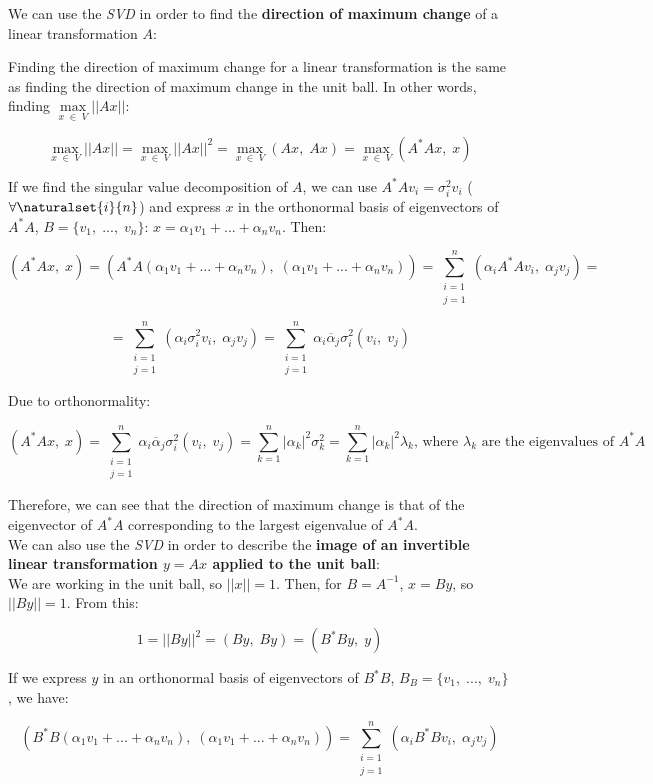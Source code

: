 We can use the \textit{SVD} in order to find the\textbf{ direction of maximum change} of a linear transformation $A$:

Finding the direction of maximum change for a linear transformation is the same as finding the direction of maximum change in the unit ball. In other words, finding $\underset{x\;\in\; V}{\max}||Ax||$:

$$\underset{ x\;\in\; V}{\max}||Ax||=\underset{ x\;\in\; V}{\max}||Ax||^2=\underset{ x\;\in\; V}{\max}(Ax,\;Ax)=\underset{ x\;\in\; V}{\max}(A^*Ax,\;x)$$

If we find the singular value decomposition of $A$, we can use $A^*Av_i=\sigma_i^2v_i$ ($\forall \naturalset{i}{n}$) and express $x$ in the orthonormal basis of eigenvectors of $A^*A$, $B=\{v_1,\;...,\;v_n\}$: $x=\alpha_1 v_1+...+\alpha_nv_n$. Then:

$$(A^*Ax,\;x)=(A^*A(\alpha_1 v_1+...+\alpha_nv_n),\;(\alpha_1 v_1+...+\alpha_nv_n))=\sum_{\substack{i=1\\j=1}}^n(\alpha_i A^*Av_i,\;\alpha_j v_j)=$$

$$=\sum_{\substack{i=1\\j=1}}^n(\alpha_i \sigma_i^2v_i,\;\alpha_j v_j)=\sum_{\substack{i=1\\j=1}}^n\alpha_i \overline{\alpha}_j \sigma_i^2(v_i,\;v_j)$$

Due to orthonormality:

$$(A^*Ax,\;x)=\sum_{\substack{i=1\\j=1}}^n\alpha_i \overline{\alpha}_j \sigma_i^2(v_i,\;v_j)=\sum_{k=1}^n|\alpha_k|^2\sigma_k^2=\sum_{k=1}^n|\alpha_k|^2\lambda_k\text{, where }\lambda_k\text{ are the eigenvalues of } A^*A$$

Therefore, we can see that the direction of maximum change is that of the eigenvector of $A^*A$ corresponding to the largest eigenvalue of $A^*A$.\\

We can also use the \textit{SVD} in order to describe the \textbf{image of an invertible linear transformation $y=Ax$ applied to the unit ball}:\\

We are working in the unit ball, so $||x||=1$. Then, for $B=A^{-1}$, $x=By$, so $||By||=1$. From this:

$$1=||By||^2=(By,\;By)=(B^*By,\;y)$$

If we express $y$ in an orthonormal basis of eigenvectors of $B^*B$, $B_B=\{v_1,\;...,\;v_n\}$, we have:

$$(B^*B(\alpha_1v_1+...+\alpha_nv_n),\;(\alpha_1v_1+...+\alpha_nv_n))=\sum_{\substack{i=1\\j=1}}^n(\alpha_i B^*Bv_i,\;\alpha_j v_j)$$

